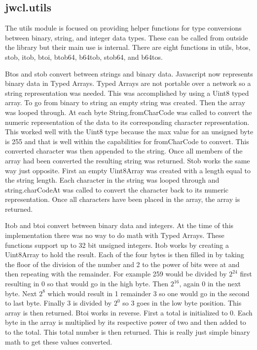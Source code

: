 \subsection{jwcl.utils}


The utils module is focused on providing helper functions for type conversions between binary, string, and integer data types. These can be called from outside the library but their main use is internal. There are eight functions in utils, btos, stob, itob, btoi, btob64, b64tob, stob64, and b64tos.


Btos and stob convert between strings and binary data. Javascript now represents binary data in Typed Arrays. \cite{mdn-typedarrays} Typed Arrays are not portable over a network so a string representation was needed. This was accomplished by using a Uint8 typed array. To go from binary to string an empty string was created. Then the array was looped through. At each byte String.fromCharCode was called to convert the numeric representation of the data to its corresponding character representation. \cite{mdn-charfrom} This worked well with the Uint8 type because the max value for an unsigned byte is 255 and that is well within the capabilities for fromCharCode to convert. This converted character was then appended to the string. Once all members of the array had been converted the resulting string was returned. Stob works the same way just opposite. First an empty Uint8Array was created with a length equal to the string length. Each character in the string was looped through and string.charCodeAt was called to convert the character back to its numeric representation. \cite{mdn-charat} Once all characters have been placed in the array, the array is returned.


Itob and btoi convert between binary data and integers. At the time of this implementation there was no way to do math with Typed Arrays. These functions support up to 32 bit unsigned integers. Itob works by creating a Uint8Array to hold the result. Each of the four bytes is then filled in by taking the floor of the division of the number and 2 to the power of bits were at and then repeating with the remainder. For example 259 would be divided by $2^24$ first resulting in 0 so that would go in the high byte. Then $2^16$, again 0 in the next byte. Next $2^8$ which would result in 1 remainder 3 so one would go in the second to last byte. Finally 3 is divided by $2^0$ so 3 goes in the low byte position. This array is then returned. Btoi works in reverse. First a total is initialized to 0. Each byte in the array is multiplied by its respective power of two and then added to to the total. This total number is then returned. This is really just simple binary math to get these values converted.


